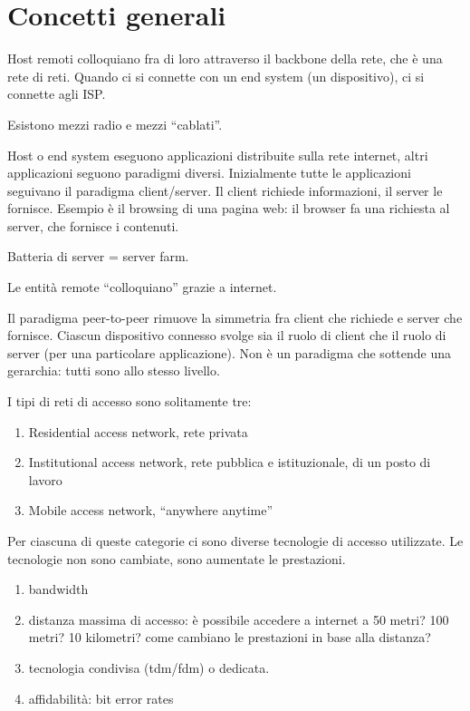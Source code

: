 \section{Concetti generali}

Host remoti colloquiano fra di loro attraverso il backbone della rete, che \`e una rete di reti. Quando ci si connette con un end system (un dispositivo), ci si connette agli ISP.

Esistono mezzi radio e mezzi ``cablati''.

Host o end system eseguono applicazioni distribuite sulla rete internet, altri applicazioni seguono paradigmi diversi. Inizialmente tutte le applicazioni seguivano il paradigma client/server. Il client richiede informazioni, il server le fornisce. Esempio \`e il browsing di una pagina web: il browser fa una richiesta al server, che fornisce i contenuti.

Batteria di server = server farm.

Le entit\`a remote ``colloquiano'' grazie a internet.

Il paradigma peer-to-peer rimuove la simmetria fra client che richiede e server che fornisce. Ciascun dispositivo connesso svolge sia il ruolo di client che il ruolo di server (per una particolare applicazione). Non \`e un paradigma che sottende una gerarchia: tutti sono allo stesso livello.

I tipi di reti di accesso sono solitamente tre:
\begin{enumerate}
    \item Residential access network, rete privata
    \item Institutional access network, rete pubblica e istituzionale, di un posto di lavoro
    \item Mobile access network, ``anywhere anytime''
\end{enumerate}

Per ciascuna di queste categorie ci sono diverse tecnologie di accesso utilizzate. Le tecnologie non sono cambiate, sono aumentate le prestazioni. 

\begin{enumerate}
    \item bandwidth
    \item distanza massima di accesso: \`e possibile accedere a internet a 50 metri? 100 metri? 10 kilometri? come cambiano le prestazioni in base alla distanza?
    \item tecnologia condivisa (tdm/fdm) o dedicata.
    \item affidabilit\`a: bit error rates
\end{enumerate}

